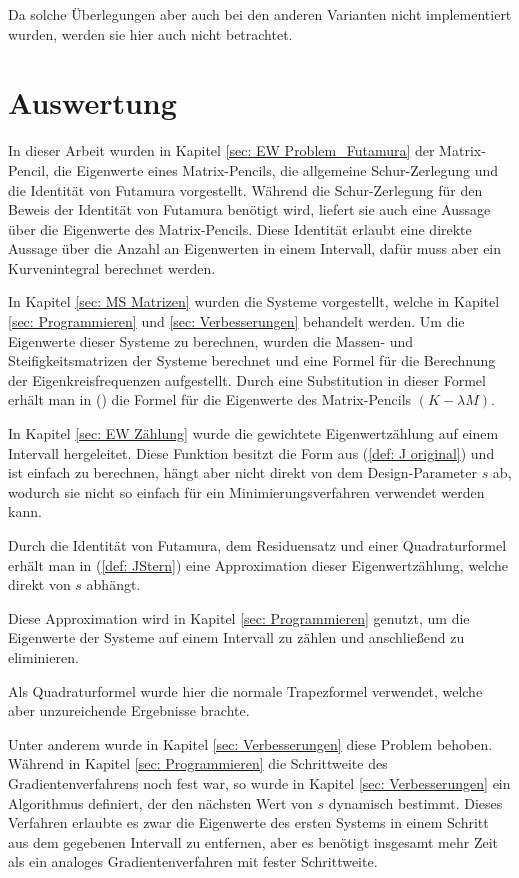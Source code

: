 \documentclass[a4paper,12pt]{report}
\newcommand{\1}{\mathds{1}}
\theoremstyle{plain} %
\theoremstyle{definition} %
\theoremstyle{remark}
\begin{document}
            Da solche Überlegungen aber auch bei den anderen Varianten nicht implementiert wurden, werden sie hier auch nicht betrachtet.
\chapter{Auswertung}
\label{sec: Auswertung}

      In dieser Arbeit wurden in Kapitel \ref{sec: EW Problem_Futamura} der Matrix-Pencil, die Eigenwerte eines Matrix-Pencils, die allgemeine Schur-Zerlegung und die Identität von Futamura vorgestellt.
      Während die Schur-Zerlegung für den Beweis der Identität von Futamura benötigt wird, liefert sie auch eine Aussage über die Eigenwerte des Matrix-Pencils.
      Diese Identität erlaubt eine direkte Aussage über die Anzahl an Eigenwerten in einem Intervall, dafür muss aber ein Kurvenintegral berechnet werden.

      In Kapitel \ref{sec: MS Matrizen} wurden die Systeme vorgestellt, welche in Kapitel \ref{sec: Programmieren} und \ref{sec: Verbesserungen} behandelt werden.
      Um die Eigenwerte dieser Systeme zu berechnen, wurden die Massen- und Steifigkeitsmatrizen der Systeme berechnet und eine Formel für die Berechnung der Eigenkreisfrequenzen aufgestellt.
      Durch eine Substitution in dieser Formel erhält man in () die Formel für die Eigenwerte des Matrix-Pencils $(K-\lambda M)$.

      In Kapitel \ref{sec: EW Zählung} wurde die gewichtete Eigenwertzählung auf einem Intervall hergeleitet. Diese Funktion besitzt die Form aus (\ref{def: J original}) und ist einfach zu berechnen, hängt aber nicht direkt von dem Design-Parameter $s$ ab,
      wodurch sie nicht so einfach für ein Minimierungsverfahren verwendet werden kann.

      Durch die Identität von Futamura, dem Residuensatz und einer Quadraturformel erhält man in (\ref{def: JStern}) eine Approximation dieser Eigenwertzählung, welche direkt von $s$ abhängt.

      Diese Approximation wird in Kapitel \ref{sec: Programmieren} genutzt, um die Eigenwerte der Systeme auf einem Intervall zu zählen und anschließend zu eliminieren.
      
      Als Quadraturformel wurde hier die normale Trapezformel verwendet, welche aber unzureichende Ergebnisse brachte.

      Unter anderem wurde in Kapitel \ref{sec: Verbesserungen} diese Problem behoben.
      Während in Kapitel \ref{sec: Programmieren} die Schrittweite des Gradientenverfahrens noch fest war, so wurde in Kapitel \ref{sec: Verbesserungen} ein Algorithmus definiert, der den nächsten Wert von $s$ dynamisch bestimmt.
      Dieses Verfahren erlaubte es zwar die Eigenwerte des ersten Systems in einem Schritt aus dem gegebenen Intervall zu entfernen, aber es benötigt insgesamt mehr Zeit als ein analoges Gradientenverfahren mit fester Schrittweite.
\end{document}
